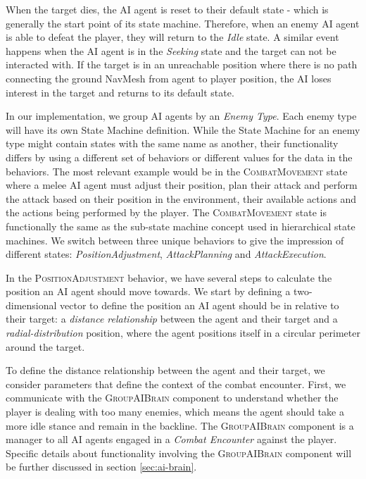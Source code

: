 When the target dies, the AI agent is reset to their default state - which is generally the start point of its state machine. Therefore, when an enemy AI agent is able to defeat the player, they will return to the \emph{Idle} state. A similar event happens when the AI agent is in the \emph{Seeking} state and the target can not be interacted with. If the target is in an unreachable position where there is no path connecting the ground NavMesh from agent to player position, the AI loses interest in the target and returns to its default state.

In our implementation, we group AI agents by an \emph{Enemy Type}. Each enemy type will have its own State Machine definition. While the State Machine for an enemy type might contain states with the same name as another, their functionality differs by using a different set of behaviors or different values for the data in the behaviors. The most relevant example would be in the \textsc{CombatMovement} state where a melee AI agent must adjust their position, plan their attack and perform the attack based on their position in the environment, their available actions and the actions being performed by the player. The \textsc{CombatMovement} state is functionally the same as the sub-state machine concept used in hierarchical state machines. We switch between three unique behaviors to give the impression of different states: \emph{PositionAdjustment}, \emph{AttackPlanning} and \emph{AttackExecution}.

In the \textsc{PositionAdjustment} behavior, we have several steps to calculate the position an AI agent should move towards. We start by defining a two-dimensional vector to define the position an AI agent should be in relative to their target: a \emph{distance relationship} between the agent and their target and a \emph{radial-distribution} position, where the agent positions itself in a circular perimeter around the target.

To define the distance relationship between the agent and their target, we consider parameters that define the context of the combat encounter. First, we communicate with the \textsc{GroupAIBrain} component to understand whether the player is dealing with too many enemies, which means the agent should take a more idle stance and remain in the backline. The \textsc{GroupAIBrain} component is a manager to all AI agents engaged in a \emph{Combat Encounter} against the player. Specific details about functionality involving the \textsc{GroupAIBrain} component will be further discussed in section \ref{sec:ai-brain}.

